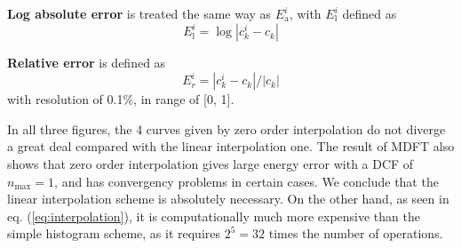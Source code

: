 \textbf{Log absolute error} is treated the same way as $E_{\mathrm{a}}^{i}$,
with $E_{\mathrm{l}}^{i}$ defined as
\begin{equation}
E_{\mathrm{l}}^{i}=\log\left|c_{k}^{i}-c_{k}\right|
\end{equation}

\textbf{Relative error} is defined as
\begin{equation}
E_{r}^{i}=\left|c_{k}^{i}-c_{k}\right|/\left|c_{k}\right|\label{eq:Er}
\end{equation}
with resolution of 0.1\%, in range of {[}0, 1{]}.

In all three figures, the 4 curves given by zero order interpolation
do not diverge a great deal compared with the linear interpolation
one. The result of MDFT also shows that zero order interpolation gives
large energy error with a DCF of $n_{\max}=1$, and has convergency
problems in certain cases. We conclude that the linear interpolation
scheme is absolutely necessary. On the other hand, as seen in eq.
(\ref{eq:interpolation}), it is computationally much more expensive
than the simple histogram scheme, as it requires $2^{5}=32$ times
the number of operations.
